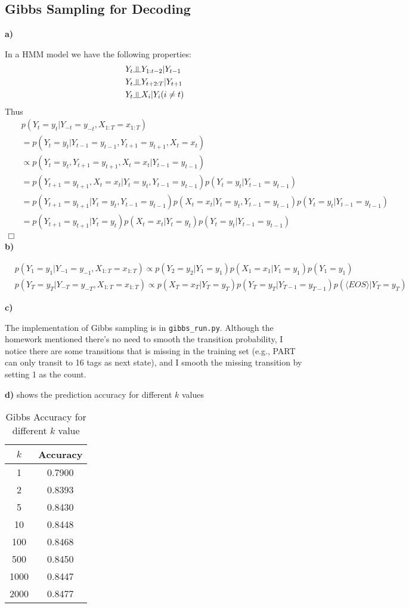 \documentclass{article}
\newcommand{\indep}{\rotatebox[origin=c]{90}{$\models$}}
\begin{document}
\subsection{Gibbs Sampling for Decoding}
\textbf{a)}

In a HMM model we have the following properties:
\begin{align*}
&Y_t \indep Y_{1:t-2} | Y_{t-1}\\
&Y_t \indep Y_{t+2:T}| Y_{t+1}\\
&Y_t \indep X_i | Y_i (i \neq t)
\end{align*}
Thus
\begin{align*}
&p(Y_t = y_t|Y_{-t} = y_{-t}, X_{1:T} = x_{1:T}) \\
&= p(Y_t = y_t|Y_{t-1}=y_{t-1},Y_{t+1} = y_{t+1}, X_{t}=x_{t})\\
&\propto p(Y_t = y_t, Y_{t+1} = y_{t+1}, X_t = x_t | Y_{t-1} = y_{t-1})\\
&= p(Y_{t+1} = y_{t+1}, X_t = x_t | Y_t = y_t, Y_{t-1} = y_{t-1})p(Y_t = y_t|Y_{t-1} = y_{t-1}) \\
&=p(Y_{t+1}=y_{t+1}|Y_t = y_t, Y_{t-1} = y_{t-1})p(X_{t}=x_{t}|Y_t = y_t, Y_{t-1} = y_{t-1})p(Y_t = y_t|Y_{t-1} = y_{t-1})\\
&=p(Y_{t+1}=y_{t+1}|Y_t = y_t)p(X_{t}=x_{t}|Y_t = y_t)p(Y_t = y_t|Y_{t-1} = y_{t-1})\\
\Box
\end{align*}
\textbf{b)}

\begin{align*}
&p(Y_1 = y_1 |Y_{-1}=y_{-1}, X_{1:T} = x_{1:T}) \propto p(Y_2 = y_2|Y_1 = y_1)p(X_1 = x_1|Y_1 = y_1)p(Y_1 = y_1)\\
&p(Y_T = y_T|Y_{-T}=y_{-T},X_{1:T} = x_{1:T}) \propto p(X_T = x_T|Y_T = y_T)p(Y_T = y_T|Y_{T-1} = y_{T-1})p(\langle EOS\rangle|Y_T = y_T)
\end{align*}

\textbf{c)}

The implementation of Gibbs sampling is in \texttt{gibbs\_run.py}. Although the homework mentioned there's no need
to smooth the transition probability, I notice there are some transitions that is missing in the training set (e.g., PART 
can only transit to 16 tags as next state), and I smooth the missing transition by setting 1 as the count.

\textbf{d)}
 shows the prediction accuracy for different $k$ values
\begin{table}
\centering
\begin{tabular}{c|c}
\textbf{$k$}&\textbf{Accuracy}\\\hline
1 & 0.7900\\\hline
2 & 0.8393\\\hline
5 & 0.8430\\\hline
10 & 0.8448\\\hline
100 & 0.8468\\\hline
500 & 0.8450\\\hline
1000 & 0.8447\\\hline
2000 & 0.8477 \\
\end{tabular}
\caption{Gibbs Accuracy for different $k$ value}
\label{tab:gibbs}
\end{table}
\end{document}
